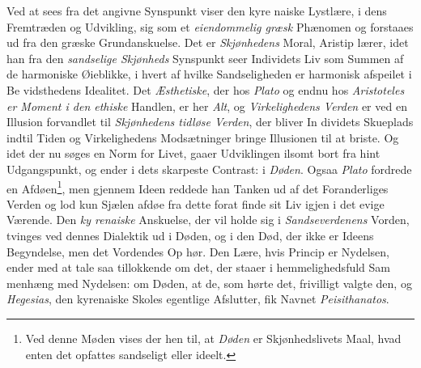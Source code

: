 Ved at sees fra det angivne Synspunkt viser den kyre\-%
naiske Lystlære, i dens Fremtræden og Udvikling, sig som et
\emph{eiendommelig græsk} Phænomen og forstaaes ud fra den
græske Grundanskuelse. Det er \emph{Skjønhedens} Moral, Aristip
lærer, idet han fra den \emph{sandselige Skjønheds} Synspunkt
seer Individets Liv som Summen af de harmoniske Øieblikke,
i hvert af hvilke Sandseligheden er harmonisk afspeilet i Be\-%
vidsthedens Idealitet. Det \emph{Æsthetiske}, der hos \emph{Plato} og
endnu hos \emph{Aristoteles er Moment i den ethiske} Handlen,
er her \emph{Alt}, og \emph{Virkelighedens Verden} er ved en Illusion
forvandlet til \emph{Skjønhedens tidløse Verden}, der bliver In\-%
dividets Skueplads indtil Tiden og Virkelighedens Modsætninger
bringe Illusionen til at briste. Og idet der nu søges en Norm
for Livet, gaaer Udviklingen ilsomt bort fra hint Udgangspunkt,
og ender i dets skarpeste Contrast: i \emph{Døden}. Ogsaa \emph{Plato}
fordrede en Afdøen\footnote{Ved denne Møden vises der hen til, at
\emph{Døden} er Skjønhedslivets Maal, hvad enten det opfattes
sandseligt eller ideelt.}, men gjennem Ideen reddede han Tanken
ud af det Foranderliges Verden og lod kun Sjælen afdøe fra
dette forat finde sit Liv igjen i det evige Værende. Den \emph{ky\-%
renaiske} Anskuelse, der vil holde sig i \emph{Sandseverdenens}
Vorden, tvinges ved dennes Dialektik ud i Døden, og i den
Død, der ikke er Ideens Begyndelse, men det Vordendes Op\-%
hør. Den Lære, hvis Princip er Nydelsen, ender med at tale
saa tillokkende om det, der staaer i hemmelighedsfuld Sam\-%
menhæng med Nydelsen: om Døden, at de, som hørte det,
frivilligt valgte den, og \emph{Hegesias}, den kyrenaiske Skoles
egentlige Afslutter, fik Navnet \emph{Peisithanatos}.

